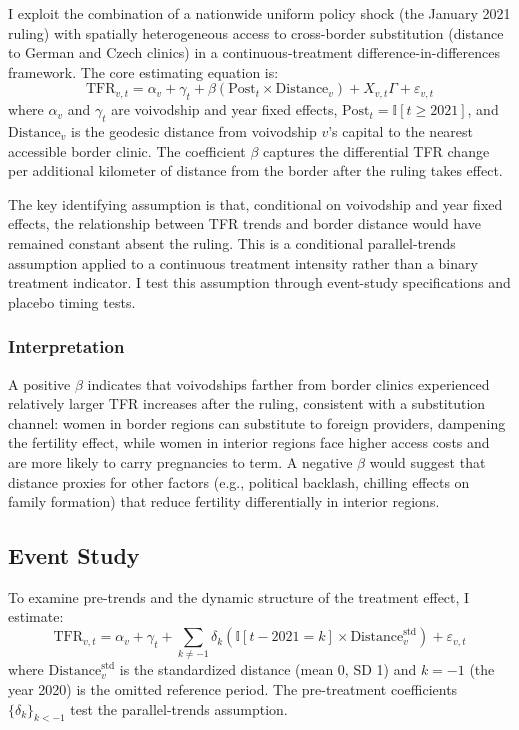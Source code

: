 \documentclass[12pt]{article}
\newcommand{\ind}{\mathbb{I}}
\begin{document}
I exploit the combination of a nationwide uniform policy shock (the January 2021 ruling) with spatially heterogeneous access to cross-border substitution (distance to German and Czech clinics) in a continuous-treatment difference-in-differences framework. The core estimating equation is:
\begin{equation}
\text{TFR}_{v,t} = \alpha_v + \gamma_t + \beta(\text{Post}_t \times \text{Distance}_v) + X_{v,t}\Gamma + \varepsilon_{v,t}
\label{eq:main}
\end{equation}
where $\alpha_v$ and $\gamma_t$ are voivodship and year fixed effects, $\text{Post}_t = \ind[t \geq 2021]$, and $\text{Distance}_v$ is the geodesic distance from voivodship $v$'s capital to the nearest accessible border clinic. The coefficient $\beta$ captures the differential TFR change per additional kilometer of distance from the border after the ruling takes effect.

The key identifying assumption is that, conditional on voivodship and year fixed effects, the relationship between TFR trends and border distance would have remained constant absent the ruling. This is a conditional parallel-trends assumption applied to a continuous treatment intensity rather than a binary treatment indicator. I test this assumption through event-study specifications and placebo timing tests.

\subsubsection*{Interpretation} A positive $\beta$ indicates that voivodships farther from border clinics experienced relatively larger TFR increases after the ruling, consistent with a substitution channel: women in border regions can substitute to foreign providers, dampening the fertility effect, while women in interior regions face higher access costs and are more likely to carry pregnancies to term. A negative $\beta$ would suggest that distance proxies for other factors (e.g., political backlash, chilling effects on family formation) that reduce fertility differentially in interior regions.

\subsection{Event Study}

To examine pre-trends and the dynamic structure of the treatment effect, I estimate:
\begin{equation}
\text{TFR}_{v,t} = \alpha_v + \gamma_t + \sum_{k \neq -1} \delta_k (\ind[t - 2021 = k] \times \text{Distance}^{\text{std}}_v) + \varepsilon_{v,t}
\label{eq:es}
\end{equation}
where $\text{Distance}^{\text{std}}_v$ is the standardized distance (mean 0, SD 1) and $k = -1$ (the year 2020) is the omitted reference period. The pre-treatment coefficients $\{\delta_k\}_{k < -1}$ test the parallel-trends assumption.
\end{document}
